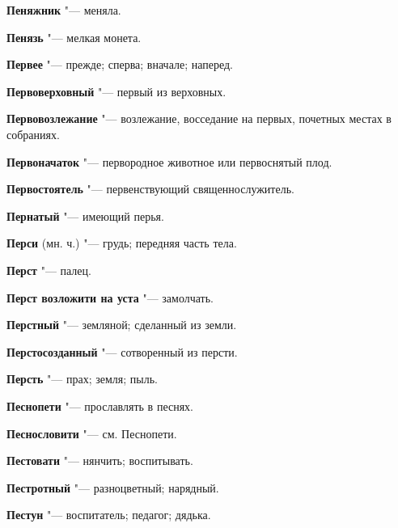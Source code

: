 \begin{mymulticols}{2}
\noindent\textbf{Пеняжник} "--- меняла. 




\noindent\textbf{Пенязь} "--- мелкая монета. 




\noindent\textbf{Первее} "--- прежде; сперва; вначале; наперед. 




\noindent\textbf{Первоверховный} "--- первый из верховных. 




\noindent\textbf{Первовозлежание} "--- возлежание, восседание на первых, почетных местах в собраниях. 




\noindent\textbf{Первоначаток} "--- первородное животное или первоснятый плод. 




\noindent\textbf{Первостоятель} "--- первенствующий священнослужитель. 




\noindent\textbf{Пернатый} "--- имеющий перья. 




\noindent\textbf{Перси} (мн. ч.) "--- грудь; передняя часть тела. 




\noindent\textbf{Перст} "--- палец. 




\noindent\textbf{Перст возложити на уста} "--- замолчать. 




\noindent\textbf{Перстный} "--- земляной; сделанный из земли. 




\noindent\textbf{Перстосозданный} "--- сотворенный из персти. 




\noindent\textbf{Персть} "--- прах; земля; пыль. 




\noindent\textbf{Песнопети} "--- прославлять в песнях. 




\noindent\textbf{Песнословити} "--- см. Песнопети. 




\noindent\textbf{Пестовати} "--- нянчить; воспитывать. 




\noindent\textbf{Пестротный} "--- разноцветный; нарядный. 




\noindent\textbf{Пестун} "--- воспитатель; педагог; дядька. 





\end{mymulticols}
